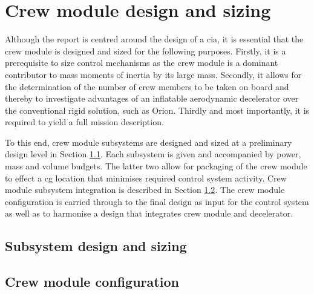 \section{Crew module design and sizing}\label{ch:crewmod}
Although the report is centred around the design of a \gls{cia}, it is essential that the crew module is designed and sized for the following purposes. Firstly, it is a prerequisite to size control mechanisms as the crew module is a dominant contributor to mass moments of inertia by its large mass. Secondly, it allows for the determination of the number of crew members to be taken on board and thereby to investigate advantages of an inflatable aerodynamic decelerator over the conventional rigid solution, such as Orion. Thirdly and most importantly, it is required to yield a full mission description.

To this end, crew module subsystems are designed and sized at a preliminary design level in Section \ref{sec:crewsubsys}. Each subsystem is given and accompanied by power, mass and volume budgets. The latter two allow for packaging of the crew module to effect a \gls{cg} location that minimises required control system activity. Crew module subsystem integration is described in Section \ref{sec:crewpackaging}. The crew module configuration is carried through to the final design as input for the control system as well as to harmonise a design that integrates crew module and decelerator.

\subsection{Subsystem design and sizing} \label{sec:crewsubsys}


\subsection{Crew module configuration} \label{sec:crewpackaging}


